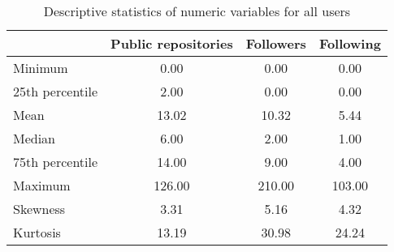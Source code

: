 
\begin{table}[h!]
\centering
\begin{tabular}{lccc}
\toprule
{} &  Public repositories &  Followers &  Following \\
\midrule
Minimum         &                 0.00 &       0.00 &       0.00 \\
25th percentile &                 2.00 &       0.00 &       0.00 \\
Mean            &                13.02 &      10.32 &       5.44 \\
Median          &                 6.00 &       2.00 &       1.00 \\
75th percentile &                14.00 &       9.00 &       4.00 \\
Maximum         &               126.00 &     210.00 &     103.00 \\
Skewness        &                 3.31 &       5.16 &       4.32 \\
Kurtosis        &                13.19 &      30.98 &      24.24 \\
\bottomrule
\end{tabular}
\caption{Descriptive statistics of numeric variables for all users}
\label{tab:stats_users}
\end{table}
